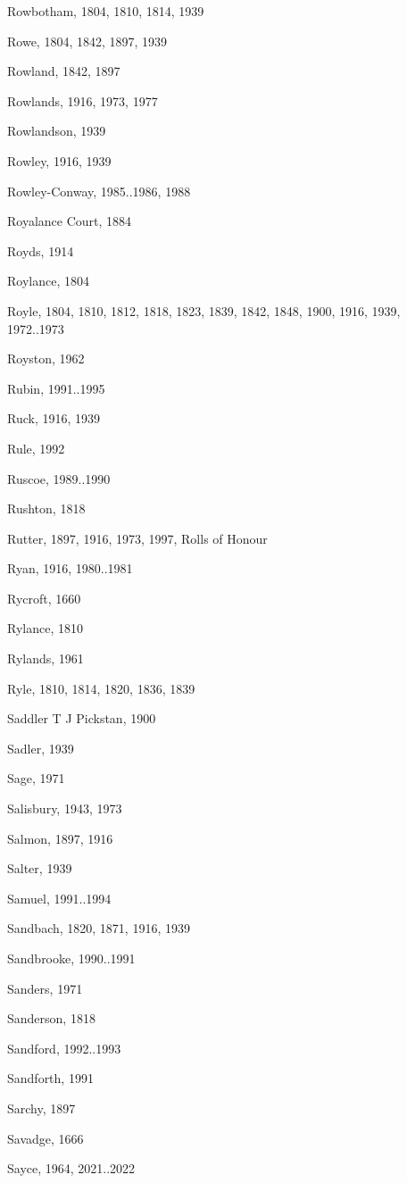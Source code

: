 \begin{theindex}
\item Rowbotham, 1804, 1810, 1814, 1939
\item Rowe, 1804, 1842, 1897, 1939
\item Rowland, 1842, 1897
\item Rowlands, 1916, 1973, 1977
\item Rowlandson, 1939
\item Rowley, 1916, 1939
\item Rowley-Conway, 1985..1986, 1988
\item Royalance Court, 1884
\item Royds, 1914
\item Roylance, 1804
\item Royle, 1804, 1810, 1812, 1818, 1823, 1839, 1842, 1848, 1900, 1916, 1939, 1972..1973
\item Royston, 1962
\item Rubin, 1991..1995
\item Ruck, 1916, 1939
\item Rule, 1992
\item Ruscoe, 1989..1990
\item Rushton, 1818
\item Rutter, 1897, 1916, 1973, 1997, Rolls of Honour
\item Ryan, 1916, 1980..1981
\item Rycroft, 1660
\item Rylance, 1810
\item Rylands, 1961
\item Ryle, 1810, 1814, 1820, 1836, 1839
\item Saddler T J Pickstan, 1900
\item Sadler, 1939
\item Sage, 1971
\item Salisbury, 1943, 1973
\item Salmon, 1897, 1916
\item Salter, 1939
\item Samuel, 1991..1994
\item Sandbach, 1820, 1871, 1916, 1939
\item Sandbrooke, 1990..1991
\item Sanders, 1971
\item Sanderson, 1818
\item Sandford, 1992..1993
\item Sandforth, 1991
\item Sarchy, 1897
\item Savadge, 1666
\item Sayce, 1964, 2021..2022

\end{theindex}
